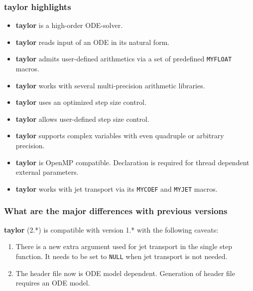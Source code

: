 \documentclass[10pt]{article}
\theoremstyle{remark}
\newcommand{\taylorname}{{\bf taylor}}
\newcommand{\myfloat}{{\tt MY\symbol{95}FLOAT}}
\newcommand{\myjet}{{\tt MY\symbol{95}JET}}
\newcommand{\mycoef}{{\tt MY\symbol{95}COEF}}
\begin{document}
\subsubsection*{\taylorname{} highlights}

\begin{itemize}
    \item \taylorname{} is a high-order ODE-solver.
    \item \taylorname{} reads input of an ODE in its natural form.
    \item \taylorname{} admits user-defined arithmetics via a set of
      predefined \myfloat{} macros.
    \item \taylorname{} works with several multi-precision arithmetic
      libraries.
    \item \taylorname{} uses an optimized step size control.
    \item \taylorname{} allows user-defined step size control.
    \item \taylorname{} supports complex variables with even quadruple
      or arbitrary precision.
    \item \taylorname{} is OpenMP compatible. Declaration is required
      for thread dependent external parameters.
    \item \taylorname{} works with jet transport via its \mycoef{} and \myjet{}
      macros.
\end{itemize}

\subsubsection*{What are the major differences with previous versions}
\taylorname{} (2.*) is compatible with version 1.* with the following
caveats:
\begin{enumerate}
\renewcommand{\labelenumi}{\theenumi.)}
    \item There is a new extra argument used for jet transport in the
      single step function. It needs to be set to \verb+NULL+ when jet
      transport is not needed.
    \item The header file now is ODE model dependent. Generation of
      header file requires an ODE model.
\end{enumerate}
\end{document}
